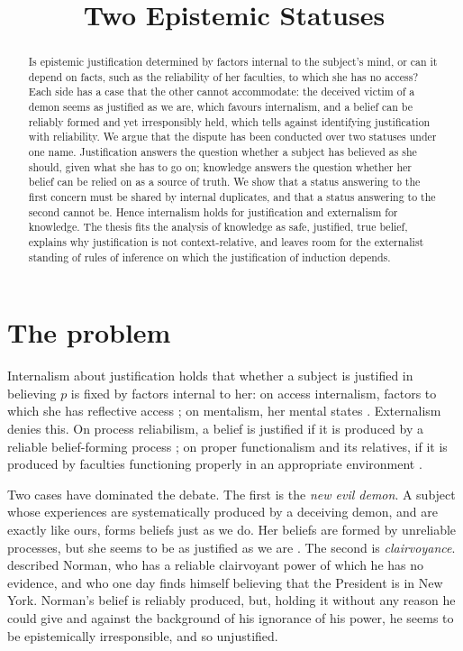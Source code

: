 \documentclass{situationist-preprint}
\title{Two Epistemic Statuses}
\begin{document}
\maketitle

\begin{abstract}
Is epistemic justification determined by factors internal to the subject's mind, or can it depend on facts, such as the reliability of her faculties, to which she has no access? Each side has a case that the other cannot accommodate: the deceived victim of a demon seems as justified as we are, which favours internalism, and a belief can be reliably formed and yet irresponsibly held, which tells against identifying justification with reliability. We argue that the dispute has been conducted over two statuses under one name. Justification answers the question whether a subject has believed as she should, given what she has to go on; knowledge answers the question whether her belief can be relied on as a source of truth. We show that a status answering to the first concern must be shared by internal duplicates, and that a status answering to the second cannot be. Hence internalism holds for justification and externalism for knowledge. The thesis fits the analysis of knowledge as safe, justified, true belief, explains why justification is not context-relative, and leaves room for the externalist standing of rules of inference on which the justification of induction depends.
\end{abstract}

\section{The problem}

Internalism about justification holds that whether a subject is justified in believing $p$ is fixed by factors internal to her: on access internalism, factors to which she has reflective access \citep{BonJour1985}; on mentalism, her mental states \citep{ConeeFeldman2001}. Externalism denies this. On process reliabilism, a belief is justified if it is produced by a reliable belief-forming process \citep{Goldman1979}; on proper functionalism and its relatives, if it is produced by faculties functioning properly in an appropriate environment \citep{Bergmann2006}.

Two cases have dominated the debate. The first is the \emph{new evil demon}. A subject whose experiences are systematically produced by a deceiving demon, and are exactly like ours, forms beliefs just as we do. Her beliefs are formed by unreliable processes, but she seems to be as justified as we are \citep{LehrerCohen1983,Cohen1984}. The second is \emph{clairvoyance}. \citet{BonJour1980} described Norman, who has a reliable clairvoyant power of which he has no evidence, and who one day finds himself believing that the President is in New York. Norman's belief is reliably produced, but, holding it without any reason he could give and against the background of his ignorance of his power, he seems to be epistemically irresponsible, and so unjustified.
\end{document}
